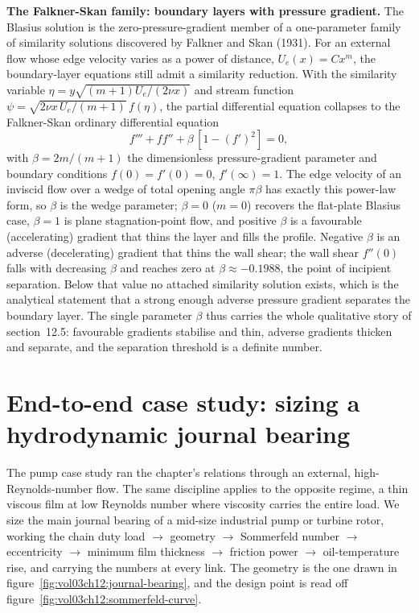 \begin{mastery}
\textbf{The Falkner-Skan family: boundary layers with pressure
gradient.} The Blasius solution is the zero-pressure-gradient member
of a one-parameter family of similarity solutions discovered by
Falkner and Skan (1931). For an external flow whose edge velocity
varies as a power of distance, $U_e(x) = C x^m$, the boundary-layer
equations still admit a similarity reduction. With the similarity
variable $\eta = y\sqrt{(m+1)U_e/(2\nu x)}$ and stream function
$\psi = \sqrt{2\nu x\,U_e/(m+1)}\,f(\eta)$, the partial differential
equation collapses to the Falkner-Skan ordinary differential
equation
\[
f''' + f f'' + \beta\,[1 - (f')^2] = 0,
\]
with $\beta = 2m/(m+1)$ the dimensionless pressure-gradient parameter
and boundary conditions $f(0) = f'(0) = 0$, $f'(\infty) = 1$. The
edge velocity of an inviscid flow over a wedge of total opening angle
$\pi\beta$ has exactly this power-law form, so $\beta$ is the wedge
parameter; $\beta = 0$ ($m=0$) recovers the flat-plate Blasius case,
$\beta = 1$ is plane stagnation-point flow, and positive $\beta$ is a
favourable (accelerating) gradient that thins the layer and fills the
profile. Negative $\beta$ is an adverse (decelerating) gradient that
thins the wall shear; the wall shear $f''(0)$ falls with decreasing
$\beta$ and reaches zero at $\beta \approx -0.1988$, the point of
incipient separation. Below that value no attached similarity
solution exists, which is the analytical statement that a strong
enough adverse pressure gradient separates the boundary layer. The
single parameter $\beta$ thus carries the whole qualitative story of
section~12.5: favourable gradients stabilise and thin, adverse
gradients thicken and separate, and the separation threshold is a
definite number.
\end{mastery}

\section{End-to-end case study: sizing a hydrodynamic journal bearing}

The pump case study ran the chapter's relations through an external,
high-Reynolds-number flow. The same discipline applies to the opposite
regime, a thin viscous film at low Reynolds number where viscosity
carries the entire load. We size the main journal bearing of a
mid-size industrial pump or turbine rotor, working the chain duty load
$\to$ geometry $\to$ Sommerfeld number $\to$ eccentricity $\to$
minimum film thickness $\to$ friction power $\to$ oil-temperature rise,
and carrying the numbers at every link. The geometry is the one drawn
in figure~\ref{fig:vol03ch12:journal-bearing}, and the design point is
read off figure~\ref{fig:vol03ch12:sommerfeld-curve}.


